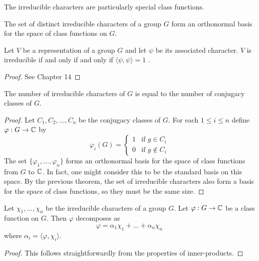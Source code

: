 The irreducible characters are particularly special class functions.
\begin{theorem}
    The set of distinct irreducible characters of a group $G$ form an orthonormal basis for the space of class 
    functions on $G$.
\end{theorem}

\begin{theorem}
    Let $V$ be a representation of a group $G$ and let $\psi$ be its associated character.  $V$ is irreducible if 
    and only if and only if $\langle \psi, \psi \rangle = 1$ .
\end{theorem}

\begin{proof}
    See \cite{James&Liebeck} Chapter 14
\end{proof}




\begin{corollary}
    The number of irreducible characters of $G$ is equal to the number of conjugacy classes of $G$.
\end{corollary}
\begin{proof}
    Let $C_1, C_2, ..., C_n$ be the conjugacy classes of $G$. For each $1 \leq i \leq n$ define $\varphi : G 
    \rightarrow \mathbb{C}$ by
    \[
        \varphi_i(G) =
        \begin{cases}
            1 &\text{if } g \in C_i \\
            0 &\text{if } g \not\in C_i
        \end{cases}
    \]
    The set $\{\varphi_1, ..., \varphi_n \}$ forms an orthonormal basis for the space of class functions from $G$ 
    to $\mathbb{C}$. In fact, one might consider this to be the standard basis on this space. By the previous theorem, the 
    set of irreducible characters also form a basis for the space of class functions, so they must be the same 
    size.
\end{proof}

    
\begin{corollary}
    Let $\chi_1, ..., \chi_n$ be the irreducible characters of a group $G$. Let $\varphi : G \rightarrow \mathbb{C}$ be a 
    class function on $G$. Then $\varphi$ decomposes as 
    \[
       \varphi = \alpha_1 \chi_1 + ... + \alpha_n \chi_n
    \]
    where $\alpha_i = \langle \varphi, \chi_i \rangle$.
\end{corollary}
\begin{proof}
    This follows straightforwardly from the properties of inner-products.
\end{proof}

